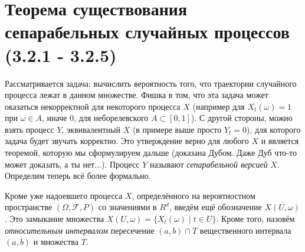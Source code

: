 \documentclass[16pt]{article}
\theoremstyle{definition}
\begin{document}
\section{Теорема существования сепарабельных случайных процессов (3.2.1 - 3.2.5)}
Рассматривается задача: вычислить вероятность того, что траектории случайного процесса лежат в данном множестве. Фишка в том, что эта задача может оказаться некорректной для некоторого процесса $X$ (например для $X_t(\omega) = 1$ при $\omega \in A$, иначе $0$, для неборелевского $A \subset [0, 1]$). С другой стороны, можно взять процесс $Y$, эквивалентный $X$ (в примере выше просто $Y_t = 0$), для которого задача будет звучать корректно. Это утверждение верно для любого $X$ и является теоремой, которую мы сформулируем дальше (доказана Дубом. Даже Дуб что-то может доказать, а ты нет...). Процесс $Y$ называют \textit{сепарабельной версией} $X$. Определим теперь всё более формально.

Кроме уже надоевшего процесса $X$, определённого на вероятностном пространстве $(\Omega, \mathcal{F}, P)$ со значениями в $R^d$, введём ещё обозначение $\overline{X(U, \omega)}$. Это замыкание множества $X(U, \omega) = \{X_t(\omega) \mid t \in U\}$. Кроме того, назовём \textit{относительным интервалом} пересечение $(a, b) \cap T$ вещественного интервала $(a, b)$ и множества $T$.
\end{document}
